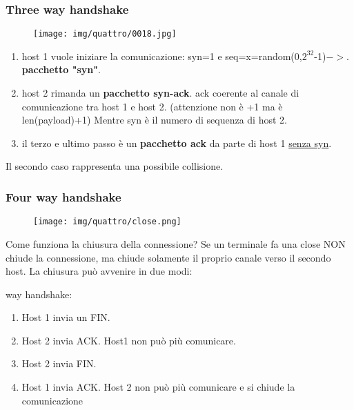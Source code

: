 \documentclass{article}
\begin{document}
\subsubsection{Three way handshake}

\begin{figure}[!ht]
    \begin{center}
        \texttt{[image: img/quattro/0018.jpg]}         
    \end{center}
\end{figure}
\begin{enumerate}
    \item host 1 vuole iniziare la comunicazione: syn=1 e seq=x=random(0,$2^{32}$-1)$->$. \textbf{pacchetto "syn"}.
    \item host 2 rimanda un \textbf{pacchetto syn-ack}. ack coerente al canale di comunicazione tra host 1 e host 2. (attenzione non è +1 ma è len(payload)+1)
    Mentre syn è il numero di sequenza di host 2.
    \item il terzo e ultimo passo è un \textbf{pacchetto ack} da parte di host 1 \underline{senza syn}.
\end{enumerate}
\noindent Il secondo caso rappresenta una possibile collisione.
\pagebreak

\subsubsection{Four way handshake}
\begin{figure}[!ht]
    \begin{center}
        \texttt{[image: img/quattro/close.png]}         
    \end{center}
\end{figure}
\noindent Come funziona la chiusura della connessione? Se un terminale fa una close NON chiude la connessione, ma chiude solamente il proprio 
canale verso il secondo host. La chiusura può avvenire in due modi:
\medskip

 way handshake:\begin{enumerate}
    \item Host 1 invia un FIN.
    \item Host 2 invia ACK. Host1 non può più comunicare.
    \item Host 2 invia FIN.
    \item Host 1 invia ACK. Host 2 non può più comunicare e si chiude la comunicazione 
\end{enumerate}
\end{document}

